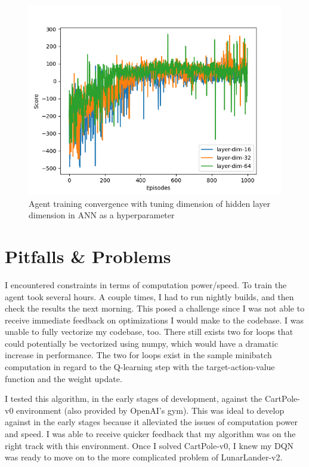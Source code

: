 \documentclass[conference]{IEEEtran}
\begin{document}
\begin{figure}[]
    \centering
    \includegraphics[scale=0.45]{figs/hyperparameter-test-hidden-layer-dim}
    \caption{Agent training convergence with tuning dimension of hidden layer dimension in ANN as a hyperparameter}
    \label{fig:hyperparameter-test-hidden-layer-dim}
\end{figure}

\section{Pitfalls \& Problems}
I encountered constraints in terms of computation power/speed. To train the agent took several hours. A couple times, I had to run nightly builds, and then check the results the next morning. This posed a challenge since I was not able to receive immediate feedback on optimizations I would make to the codebase. I was unable to fully vectorize my codebase, too. There still exists two for loops that could potentially be vectorized using numpy, which would have a dramatic increase in performance. The two for loops exist in the sample minibatch computation in regard to the Q-learning step with the target-action-value function and the weight update.

I tested this algorithm, in the early stages of development, against the CartPole-v0 environment (also provided by OpenAI's gym). This was ideal to develop against in the early stages because it alleviated the issues of computation power and speed. I was able to receive quicker feedback that my algorithm was on the right track with this environment. Once I solved CartPole-v0, I knew my DQN was ready to move on to the more complicated problem of LunarLander-v2.
\end{document}
